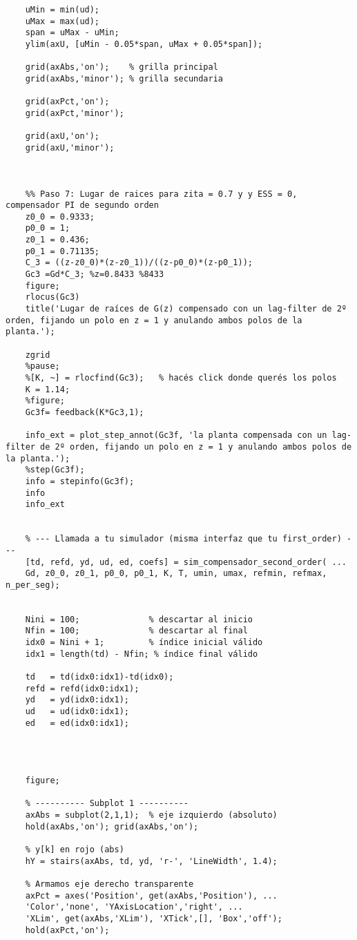 \begin{lstlisting}[style=matlabstyle,caption={Primera hoja de cálculos utilizada.},label={matlab:calculo1}]
	% --- Margen de 5% en eje Y ---
	uMin = min(ud);
	uMax = max(ud);
	span = uMax - uMin;
	ylim(axU, [uMin - 0.05*span, uMax + 0.05*span]);
	
	grid(axAbs,'on');    % grilla principal
	grid(axAbs,'minor'); % grilla secundaria
	
	grid(axPct,'on');
	grid(axPct,'minor');
	
	grid(axU,'on');
	grid(axU,'minor');
	
	
	
	%% Paso 7: Lugar de raices para zita = 0.7 y y ESS = 0, compensador PI de segundo orden
	z0_0 = 0.9333;
	p0_0 = 1;
	z0_1 = 0.436;
	p0_1 = 0.71135;
	C_3 = ((z-z0_0)*(z-z0_1))/((z-p0_0)*(z-p0_1));
	Gc3 =Gd*C_3; %z=0.8433 %8433
	figure;
	rlocus(Gc3)
	title('Lugar de raíces de G(z) compensado con un lag-filter de 2º orden, fijando un polo en z = 1 y anulando ambos polos de la planta.');
	
	zgrid
	%pause;
	%[K, ~] = rlocfind(Gc3);   % hacés click donde querés los polos
	K = 1.14;
	%figure;
	Gc3f= feedback(K*Gc3,1);
	
	info_ext = plot_step_annot(Gc3f, 'la planta compensada con un lag-filter de 2º orden, fijando un polo en z = 1 y anulando ambos polos de la planta.');
	%step(Gc3f);
	info = stepinfo(Gc3f);
	info
	info_ext
	
	
	% --- Llamada a tu simulador (misma interfaz que tu first_order) ---
	[td, refd, yd, ud, ed, coefs] = sim_compensador_second_order( ...
	Gd, z0_0, z0_1, p0_0, p0_1, K, T, umin, umax, refmin, refmax, n_per_seg);
	
	
	Nini = 100;              % descartar al inicio
	Nfin = 100;              % descartar al final
	idx0 = Nini + 1;         % índice inicial válido
	idx1 = length(td) - Nfin; % índice final válido
	
	td   = td(idx0:idx1)-td(idx0);
	refd = refd(idx0:idx1);
	yd   = yd(idx0:idx1);
	ud   = ud(idx0:idx1);
	ed   = ed(idx0:idx1);
	
	
	
	
	figure;
	
	% ---------- Subplot 1 ----------
	axAbs = subplot(2,1,1);  % eje izquierdo (absoluto)
	hold(axAbs,'on'); grid(axAbs,'on');
	
	% y[k] en rojo (abs)
	hY = stairs(axAbs, td, yd, 'r-', 'LineWidth', 1.4);
	
	% Armamos eje derecho transparente
	axPct = axes('Position', get(axAbs,'Position'), ...
	'Color','none', 'YAxisLocation','right', ...
	'XLim', get(axAbs,'XLim'), 'XTick',[], 'Box','off');
	hold(axPct,'on');
	

\end{lstlisting}
